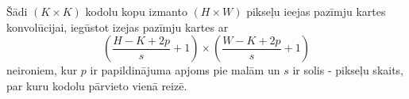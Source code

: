 Šādi \((K \times K)\) kodolu kopu izmanto \((H \times W)\) pikseļu ieejas pazīmju kartes konvolūcijai, iegūstot izejas pazīmju kartes ar
\begin{equation}
  \left( \frac{H - K + 2p}{s} + 1 \right) \times \left( \frac{W - K + 2p}{s} + 1 \right)
\end{equation}
neironiem, kur \(p\) ir papildinājuma apjoms pie malām un \(s\) ir solis - pikseļu skaits, par kuru kodolu pārvieto vienā reizē.

%
%
%
%
%


